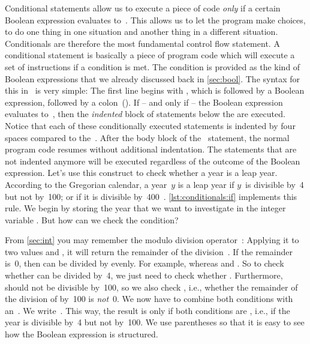 %
%
Conditional statements allow us to execute a piece of code \emph{only} if a certain Boolean expression evaluates to~.
This allows us to let the program make choices, to do one thing in one situation and another thing in a different situation.
Conditionals are therefore the most fundamental control flow statement.%
%
%
%
A conditional statement is basically a piece of program code which will execute a set of instructions if a condition is met.
The condition is provided as the kind of Boolean expressions that we already discussed back in \cref{sec:bool}.
The syntax for this in \python\ is very simple:%
%
%
%
\FloatBarrier%
%
%
%
%
The first line begins with , which is followed by a Boolean expression, followed by a colon~(\pythonilIdx{:}).
If -- and only if -- the Boolean expression evaluates to~, then the \emph{indented} block of statements below the  are executed.
Notice that each of these conditionally executed statements is indented by four spaces compared to the~.
After the body block of the ~statement, the normal program code resumes without additional indentation.
The statements that are not indented anymore will be executed regardless of the outcome of the Boolean expression.%
%
%
%
Let's use this construct to check whether a year is a leap year.
According to the Gregorian calendar, a year~$y$ is a leap year if $y$~is divisible by~4 but not by~100; or if it is divisible by~400~\cite{EOEBEB:LR}.
\cref{lst:conditionals:if} implements this rule.
We begin by storing the year that we want to investigate in the integer variable .
But how can we check the condition?

From \cref{sec:int} you may remember the modulo division operator~\pythonilIdx{\%}:
Applying it to two values  and , it will return the remainder of the division~\pythonIdx{//}.
If the remainder is~0, then  can be divided by  evenly.
For example,  whereas  and .
So to check whether  can be divided by~4, we just need to check whether .
Furthermore,  should not be divisible by~100, so we also check , i.e., whether the remainder of the division of  by~100 is \emph{not}~0.
We now have to combine both conditions with an~.
We write~.
This way, the result is only  if both conditions are , i.e., if the year is divisible by~4 but not by~100.
We use parentheses so that it is easy to see how the Boolean expression is structured.

